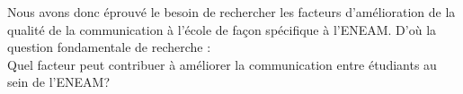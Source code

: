 \documentclass[a4paper,12pt,french]{report} %
\begin{document}
Nous avons donc éprouvé le besoin de rechercher les facteurs d'amélioration de la qualité de la communication à l'école de façon spécifique à l'ENEAM. D'où la question fondamentale de recherche : \\
Quel facteur peut contribuer à améliorer la communication entre étudiants au sein de l'ENEAM?

\end{document}
